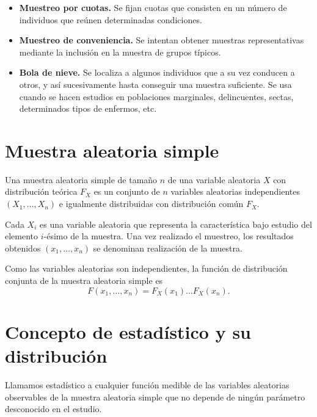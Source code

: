 \begin{itemize}
    \item \textbf{Muestreo por cuotas.}
          Se fijan cuotas que consisten en un número de individuos que reúnen determinadas condiciones.

    \item \textbf{Muestreo de conveniencia.}
          Se intentan obtener muestras representativas mediante la inclusión en la muestra de grupos típicos.

    \item \textbf{Bola de nieve.}
          Se localiza a algunos individuos que a su vez conducen a otros, y así sucesivamente hasta conseguir una muestra suficiente. Se usa cuando se hacen estudios en poblaciones marginales, delincuentes, sectas, determinados tipos de enfermos, etc.
\end{itemize}

\section{Muestra aleatoria simple}

\begin{definition}
    Una muestra aleatoria simple de tamaño $n$ de una variable aleatoria $X$ con distribución teórica $F_X$ es un conjunto de $n$ variables aleatorias independientes $(X_1, \dots, X_n)$ e igualmente distribuidas con distribución común $F_X$.
\end{definition}

Cada $X_i$ es una variable aleatoria que representa la característica bajo estudio del elemento $i$-ésimo de la muestra.
Una vez realizado el muestreo, los resultados obtenidos $(x_1, \dots, x_n)$ se denominan realización de la muestra.

Como las variables aleatorias son independientes, la función de distribución conjunta de la muestra aleatoria simple es
$$F(x_1, \dots, x_n) = F_X(x_1) \dots F_X(x_n).$$

\section{Concepto de estadístico y su distribución}

\begin{definition}
    Llamamos estadístico a cualquier función medible de las variables aleatorias observables de la muestra aleatoria simple que no depende de ningún parámetro desconocido en el estudio.
\end{definition}


